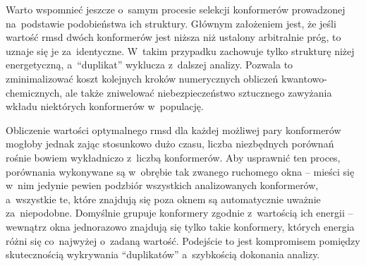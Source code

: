 Warto wspomnieć jeszcze o~samym procesie selekcji konformerów prowadzonej na~podstawie
  podobieństwa ich struktury.
Głównym założeniem jest, że jeśli wartość \gls{rmsd} dwóch konformerów jest niższa niż
  ustalony arbitralnie próg, to uznaje się je za~identyczne.
W~takim przypadku \tesliper{} zachowuje tylko strukturę niżej energetyczną, a~\enquote{duplikat}
  wyklucza z~dalszej analizy.
Pozwala to zminimalizować koszt kolejnych kroków numerycznych obliczeń kwantowo-chemicznych,
  ale także zniwelować niebezpieczeństwo sztucznego zawyżania
  wkładu niektórych konformerów w~populację.

Obliczenie wartości optymalnego \gls{rmsd} dla każdej możliwej pary konformerów mogłoby
  jednak zając stosunkowo dużo czasu, liczba niezbędnych porównań rośnie bowiem
  wykładniczo z~liczbą konformerów.
Aby usprawnić ten proces, porównania wykonywane są w~obrębie tak zwanego ruchomego okna \---
  mieści się w~nim jedynie pewien podzbiór wszystkich analizowanych konformerów,
  a~wszystkie te, które znajdują się poza oknem są automatycznie uważnie za~niepodobne.
Domyślnie \tesliper{} grupuje konformery zgodnie z~wartością ich energii \--- wewnątrz
  okna jednorazowo znajdują się tylko takie konformery, których energia różni się
  co~najwyżej o~zadaną wartość.
Podejście to jest kompromisem pomiędzy skutecznością wykrywania \enquote{duplikatów}
  a~szybkością dokonania analizy.

